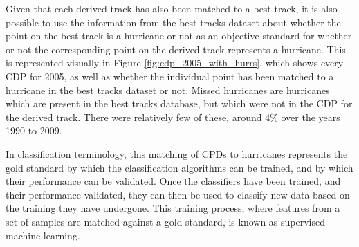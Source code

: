 \documentclass[pdftex,12pt,a4paper]{report}
\begin{document}
Given that each derived track has also been matched to a best track, it is also possible to use the
information from the best tracks dataset about whether the point on the best track is a hurricane or
not as an objective standard for whether or not the corresponding point on the derived track
represents a hurricane. This is represented visually in Figure \ref{fig:cdp_2005_with_hurrs}, which
shows every CDP for 2005, as well as whether the individual point has been matched to a
hurricane in the best tracks dataset or not. Missed hurricanes are hurricanes which are present in
the best tracks database, but which were not in the CDP for the derived track. 
There were relatively few of these, around 4\% over the years 1990 to 2009. 

In classification terminology, this matching of CPDs to hurricanes represents the gold standard by
which the classification algorithms can be trained, and by which their performance can be validated.
Once the classifiers have been trained, and their performance validated, they can then be used to
classify new data based on the training they have undergone. This training process, where features
from a set of samples are matched against a gold standard, is known as supervised machine learning.

\end{document}
